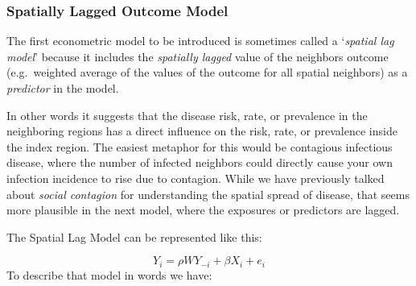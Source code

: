 \documentclass[
]{book}
\begin{document}
\hypertarget{spatially-lagged-outcome-model}{%
\subsubsection{Spatially Lagged Outcome Model}\label{spatially-lagged-outcome-model}}

The first econometric model to be introduced is sometimes called a `\emph{spatial lag model}' because it includes the \emph{spatially lagged} value of the neighbors outcome (e.g.~weighted average of the values of the outcome for all spatial neighbors) as a \emph{predictor} in the model.

In other words it suggests that the disease risk, rate, or prevalence in the neighboring regions has a direct influence on the risk, rate, or prevalence inside the index region. The easiest metaphor for this would be contagious infectious disease, where the number of infected neighbors could directly cause your own infection incidence to rise due to contagion. While we have previously talked about \emph{social contagion} for understanding the spatial spread of disease, that seems more plausible in the next model, where the exposures or predictors are lagged.

The Spatial Lag Model can be represented like this:

\[Y_i=\rho WY_{-i} + \beta X_i + e_i\]
To describe that model in words we have:
\end{document}
